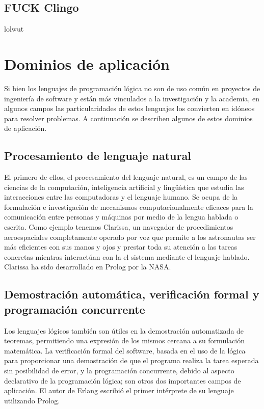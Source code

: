 \documentclass[11pt,captions=nooneline,DIV=14, parskip=full]{scrartcl}
\begin{document}
\subsection{FUCK Clingo}
lolwut

\section{Dominios de aplicación}
\label{sec:dominios}
Si bien los lenguajes de programación lógica no son de uso común en proyectos de ingeniería de software y están más vinculados a la investigación y la academia, en algunos campos las particularidades de estos lenguajes los convierten en idóneos para resolver problemas. A continuación se describen algunos de estos dominios de aplicación.

\subsection{Procesamiento de lenguaje natural}
El primero de ellos, el procesamiento del lenguaje natural, es un campo de las ciencias de la computación, inteligencia artificial y lingüística que estudia las interacciones entre las computadoras y el lenguaje humano. Se ocupa de la formulación e investigación de mecanismos computacionalmente eficaces para la comunicación entre personas y máquinas por medio de la lengua hablada o escrita. Como ejemplo tenemos Clarissa, un navegador de procedimientos aeroespaciales completamente operado por voz que permite a los astronautas ser más eficientes con sus manos y ojos y prestar toda su atención a las tareas concretas mientras interactúan con la el sistema mediante el lenguaje hablado. Clarissa ha sido desarrollado en Prolog por la NASA.

\subsection{Demostración automática, verificación formal y programación concurrente}
Los lenguajes lógicos también son útiles en la demostración automatizada de teoremas, permitiendo una expresión de los mismos cercana a su formulación matemática. La verificación formal del software, basada en el uso de la lógica para proporcionar una demostración de que el programa realiza la tarea esperada sin posibilidad de error, y la programación concurrente, debido al aspecto declarativo de la programación lógica; son otros dos importantes campos de aplicación. El autor de Erlang escribió el primer intérprete de su lenguaje utilizando Prolog.
\end{document}
